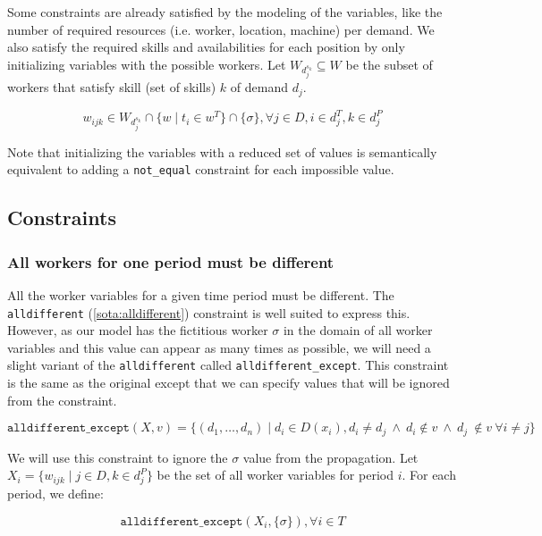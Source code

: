 \documentclass[../../thesis.tex]{subfiles}
\begin{document}
Some constraints are already satisfied by the modeling of the variables, like the number of required resources (i.e. worker, location, machine)
per demand. We also satisfy the required skills and availabilities for each position by only initializing variables with the 
possible workers. Let $W_{d^{s_k}_j} \subseteq W$ be the subset of workers that satisfy skill (set of skills) $k$ of demand $d_j$.

\begin{equation}
  w_{ijk} \in W_{d^{s_k}_j} \cap \{ w \mid t_i \in w^T \} \cap \{ \sigma \}, \forall j \in D, i \in d^T_j, k \in d^P_j
\end{equation}

Note that initializing the variables with a reduced set of values is semantically equivalent to adding a \texttt{not\_equal} constraint for each impossible value.

\subsection{Constraints}

\subsubsection{All workers for one period must be different}

All the worker variables for a given time period must be different. 
The \texttt{alldifferent} (\autoref{sota:alldifferent}) constraint is well suited to express this. 
However, as our model has the fictitious worker $\sigma$ in the domain of all worker variables and this value 
can appear as many times as possible, we will need a slight variant of the \texttt{alldifferent} called \texttt{alldifferent\_except}. 
This constraint is the same as the original except that we can specify values that will be ignored from 
the constraint.

\begin{equation*}
   \texttt{alldifferent\_except} (X, v) = \{ (d_1, \dots, d_n) \mid d_i \in D(x_i), d_i \neq d_j \ \land \ d_i \notin v \ \land \ d_j \ \notin v \  \forall i \neq j \}
\end{equation*}

We will use this constraint to ignore the $\sigma$ value from the propagation. Let $X_i = \{w_{ijk} \mid j \in D, k \in d_j^P \}$ be the set of all worker variables for period $i$. For each period, we define:

\begin{equation}
  \texttt{alldifferent\_except}(X_i, \{ \sigma \}), \forall i \in T
\end{equation}
\end{document}
